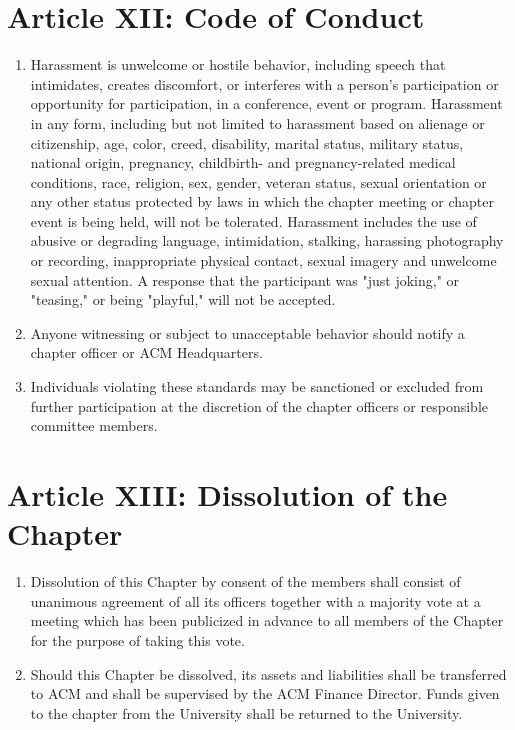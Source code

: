 \section*{Article XII: Code of Conduct}

\begin{enumerate}
	\item Harassment is unwelcome or hostile behavior, including speech that
				intimidates, creates discomfort, or interferes with a person's
				participation or opportunity for participation, in a conference, event
				or program. Harassment in any form, including but not limited to
				harassment based on alienage or citizenship, age, color, creed,
				disability, marital status, military status, national origin, pregnancy,
				childbirth- and pregnancy-related medical conditions, race, religion,
				sex, gender, veteran status, sexual orientation or any other status
				protected by laws in which the chapter meeting or chapter event is being
				held, will not be tolerated. Harassment includes the use of abusive or
				degrading language, intimidation, stalking, harassing photography or
				recording, inappropriate physical contact, sexual imagery and unwelcome
				sexual attention. A response that the participant was "just joking," or
				"teasing," or being "playful," will not be accepted.
	\item Anyone witnessing or subject to unacceptable behavior should notify a
				chapter officer or ACM Headquarters.
	\item Individuals violating these standards may be sanctioned or excluded from
				further participation at the discretion of the chapter officers or
				responsible committee members.
\end{enumerate}

\section*{Article XIII: Dissolution of the Chapter}

\begin{enumerate}
	\item Dissolution of this Chapter by consent of the members shall consist of
				unanimous agreement of all its officers together with a majority vote at
				a meeting which has been publicized in advance to all members of the
				Chapter for the purpose of taking this vote.
	\item Should this Chapter be dissolved, its assets and liabilities shall be
				transferred to ACM and shall be supervised by the ACM Finance Director.
				Funds given to the chapter from the University shall be returned to the
				University.
\end{enumerate}



